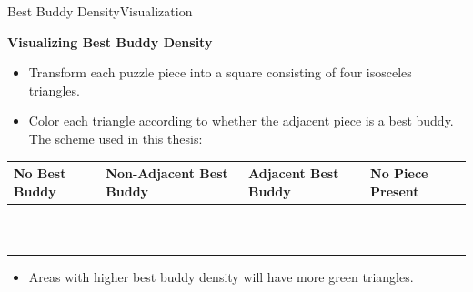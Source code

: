 \documentclass[handout,10pt]{beamer}  %
\begin{document}
\begin{frame}{Best Buddy Density}{Visualization}  
  \begin{block}{\textbf{Visualizing Best Buddy Density}}
    \begin{itemize}
      \setlength\itemsep{1em}
      \item Transform each puzzle piece into a square consisting of four isosceles triangles.
      \item Color each triangle according to whether the adjacent piece is a best buddy.  The scheme used in this thesis:
    \end{itemize}
    {\footnotesize 
	    {\setlength\extrarowheight{2pt}
		    \begin{table}
		      \begin{center}
		        \begin{tabular}{ | >{\centering\arraybackslash}m{0.62in} | >{\centering\arraybackslash}m{0.78in} | >{\centering\arraybackslash}m{0.7in} | >{\centering\arraybackslash}m{0.62in} | }
		          \Xhline{1pt}
			        \textbf{No Best Buddy} 
			        & \textbf{Non-Adjacent Best Buddy}
			        & \textbf{Adjacent Best Buddy}
			        & \textbf{No Piece Present}
			        \\ \hline \hline
		          {\tiny \cellcolor{white}~} 
		          & {\tiny \cellcolor{red}~} 
		          & {\tiny \cellcolor{green}~} 
		          & {\tiny \cellcolor{black}~} 
		          \\
		          {\tiny \cellcolor{white}~} 
		          & {\tiny \cellcolor{red}~} 
		          & {\tiny \cellcolor{green}~} 
		          & {\tiny \cellcolor{black}~}
		          \\ \Xhline{1pt}
		        \end{tabular}
		      \end{center}
		    \end{table}
		  }}
    \begin{itemize}
      \setlength\itemsep{1em}
      \item Areas with higher best buddy density will have more green triangles.
    \end{itemize}
  \end{block}
\end{frame}
\end{document}

